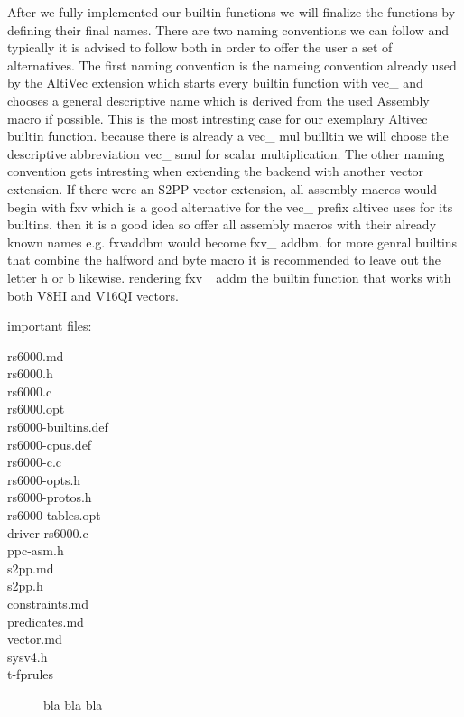 After we fully implemented our builtin functions we will finalize the functions by defining their final names.
There are two naming conventions we can follow and typically it is advised to follow both in order to offer the user a set of alternatives.
The first naming convention is the nameing convention already used by the AltiVec extension which starts every builtin function with vec\_ and chooses a general descriptive name which is derived from the used Assembly macro if possible.
This is the most intresting case for our exemplary Altivec builtin function.
because there is already a vec\_ mul builltin we will choose the descriptive abbreviation vec\_ smul for scalar multiplication.
The other naming convention gets intresting when extending the backend with another vector extension.
If there were an S2PP vector extension, all assembly macros would begin with fxv which is a good alternative for the vec\_ prefix altivec uses for its builtins.
then it is a good idea so offer all assembly macros with their already known names e.g.
fxvaddbm would become fxv\_ addbm.
for more genral builtins that combine the halfword and byte macro it is recommended to leave out the letter h or b likewise.
rendering fxv\_ addm the builtin function that works with both V8HI and V16QI vectors.

important files:
\begin{description}
    \item[rs6000.md]
    \item[rs6000.h]
    \item[rs6000.c]
    \item[rs6000.opt]
    \item[rs6000-builtins.def]
    \item[rs6000-cpus.def]
    \item[rs6000-c.c]
    \item[rs6000-opts.h]
    \item[rs6000-protos.h]
    \item[rs6000-tables.opt]
    \item[driver-rs6000.c]
    \item[ppc-asm.h]
    \item[s2pp.md]
    \item[s2pp.h]
    \item[constraints.md]
    \item[predicates.md]
    \item[vector.md]
    \item[sysv4.h]
    \item[t-fprules] bla bla bla
\end{description}
